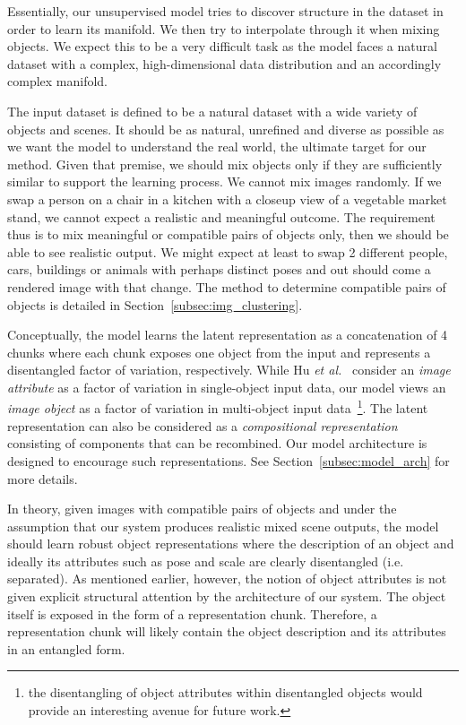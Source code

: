 \documentclass[a4paper,12pt]{report}
\begin{document}
Essentially, our unsupervised model tries to discover structure in the dataset in order to learn its manifold. We then try to interpolate through it when mixing objects. We expect this to be a very difficult task as the model faces a natural dataset with a complex, high-dimensional data distribution and an accordingly complex manifold. 

The input dataset is defined to be a natural dataset with a wide variety of objects and scenes. It should be as natural, unrefined and diverse as possible as we want the model to understand the real world, the ultimate target for our method. Given that premise, we should mix objects only if they are sufficiently similar to support the learning process. We cannot mix images randomly. If we swap a person on a chair in a kitchen with a closeup view of a vegetable market stand, we cannot expect a realistic and meaningful outcome. The requirement thus is to mix meaningful or compatible pairs of objects only, then we should be able to see realistic output. We might expect at least to swap 2 different people, cars, buildings or animals with perhaps distinct poses and out should come a rendered image with that change. The method to determine compatible pairs of objects is detailed in Section~\ref{subsec:img_clustering}. 

Conceptually, the model learns the latent representation as a concatenation of 4 chunks where each chunk exposes one object from the input and represents a disentangled factor of variation, respectively. While Hu \textit{et al.}~\cite{DisentFacOfVarByMixTh} consider an \textit{image attribute} as a factor of variation in single-object input data, our model views an \textit{image object} as a factor of variation in multi-object input data~\footnote{the disentangling of object attributes within disentangled objects would provide an interesting avenue for future work.}. The latent representation can also be considered as a \textit{compositional representation}~\cite{SpatialBDecoder} consisting of components that can be recombined. %
Our model architecture is designed to encourage such representations. See Section~\ref{subsec:model_arch} for more details. 

In theory, given images with compatible pairs of objects and under the assumption that our system produces realistic mixed scene outputs, the model should learn robust object representations where the description of an object and ideally its attributes such as pose and scale are clearly disentangled (i.e. separated). As mentioned earlier, however, the notion of object attributes is not given explicit structural attention by the architecture of our system. The object itself is exposed in the form of a representation chunk. Therefore, a representation chunk will likely contain the object description and its attributes in an entangled form.
\end{document}
